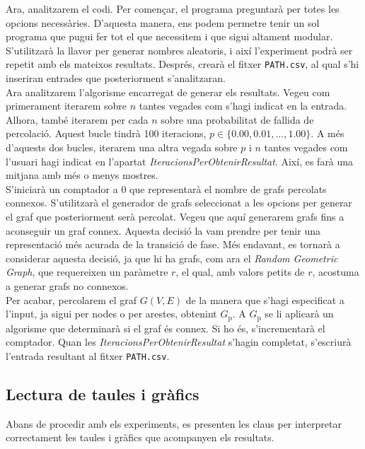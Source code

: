 \documentclass[a4paper]{article}
\begin{document}
	Ara, analitzarem el codi. Per començar, el programa preguntarà per totes les opcions necessàries. D'aquesta manera, ens podem permetre tenir un sol programa que pugui fer tot el que necessitem i que sigui altament modular. S'utilitzarà la llavor per generar nombres aleatoris, i així l'experiment podrà ser repetit amb els mateixos resultats. Després, crearà el fitxer \texttt{PATH.csv}, al qual s'hi inseriran entrades que posteriorment s'analitzaran. \\
	
	Ara analitzarem l'algorisme encarregat de generar els resultats. Vegeu com primerament iterarem sobre $n$ tantes vegades com s'hagi indicat en la entrada. Alhora, també iterarem per cada $n$ sobre una probabilitat de fallida de percolació. Aquest bucle tindrà 100 iteracions, $p \in \{0.00, 0.01, \dots, 1.00\}$. A més d'aquests dos bucles, iterarem una altra vegada sobre $p$ i $n$ tantes vegades com l'usuari hagi indicat en l'apartat \textit{IteracionsPerObtenirResultat}. Així, es farà una mitjana amb més o menys mostres. \\
	
	S'iniciarà un comptador a 0 que representarà el nombre de grafs percolats connexos. S'utilitzarà el generador de grafs seleccionat a les opcions per generar el graf que posteriorment serà percolat. Vegeu que aquí generarem grafs fins a aconseguir un graf connex. Aquesta decisió la vam prendre per tenir una representació més acurada de la transició de fase. Més endavant, es tornarà a considerar aquesta decisió, ja que hi ha grafs, com ara el \textit{Random Geometric Graph}, que requereixen un paràmetre $r$, el qual, amb valors petits de $r$, acostuma a generar grafs no connexos. \\
	
	Per acabar, percolarem el graf $G(V,E)$ de la manera que s'hagi especificat a l'input, ja sigui per nodes o per arestes, obtenint $G_{\text{p}}$. A $G_{\text{p}}$ se li aplicarà un algorisme que determinarà si el graf és connex. Si ho és, s'incrementarà el comptador. Quan les \textit{IteracionsPerObtenirResultat} s'hagin completat, s'escriurà l'entrada resultant al fitxer \texttt{PATH.csv}.
	
	\subsection{Lectura de taules i gràfics}
	
	Abans de procedir amb els experiments, es presenten les claus per interpretar correctament les taules i gràfics que acompanyen els resultats. \\
	
\end{document}

